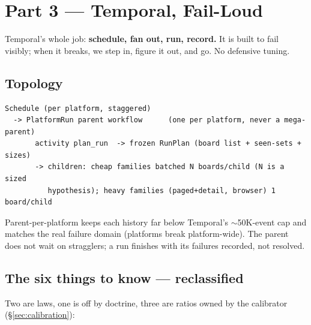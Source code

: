 \documentclass[11pt,a4paper]{article}
\begin{document}
\section{Part 3 --- Temporal, Fail-Loud}
\label{sec:temporal}

Temporal's whole job: \textbf{schedule, fan out, run, record.} It is built to fail visibly; when it breaks,
we step in, figure it out, and go. No defensive tuning.

\subsection{Topology}
\begin{verbatim}
Schedule (per platform, staggered)
  -> PlatformRun parent workflow      (one per platform, never a mega-parent)
       activity plan_run  -> frozen RunPlan (board list + seen-sets + sizes)
       -> children: cheap families batched N boards/child (N is a sized
          hypothesis); heavy families (paged+detail, browser) 1 board/child
\end{verbatim}
Parent-per-platform keeps each history far below Temporal's $\sim$50K-event cap and matches the real failure
domain (platforms break platform-wide). The parent does not wait on stragglers; a run finishes with its
failures recorded, not resolved.

\subsection{The six things to know --- reclassified}
Two are laws, one is off by doctrine, three are ratios owned by the calibrator (\S\ref{sec:calibration}):
\end{document}
